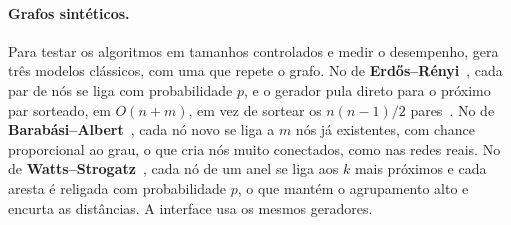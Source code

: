 \paragraph{Grafos sintéticos.} Para testar os algoritmos em tamanhos controlados e medir o
desempenho,  gera três modelos clássicos, com uma  que
repete o grafo. No de \textbf{Erdős--Rényi}~\cite{erdos1959}, cada par de nós se liga com
probabilidade $p$, e o gerador pula direto para o próximo par sorteado, em $O(n + m)$, em vez de
sortear os $n(n-1)/2$ pares~\cite{batagelj2005}. No de \textbf{Barabási--Albert}~\cite{barabasi1999},
cada nó novo se liga a $m$ nós já existentes, com chance proporcional ao grau, o que cria nós muito
conectados, como nas redes reais. No de \textbf{Watts--Strogatz}~\cite{watts1998}, cada nó de um anel
se liga aos $k$ mais próximos e cada aresta é religada com probabilidade $p$, o que mantém o
agrupamento alto e encurta as distâncias. A interface usa os mesmos geradores.
